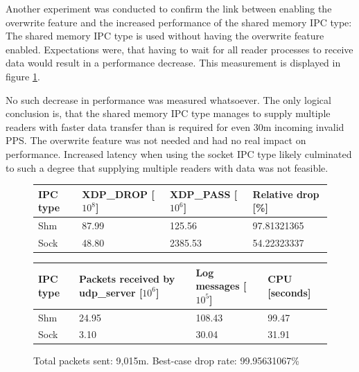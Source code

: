 Another experiment was conducted to confirm the link between enabling the overwrite feature and the increased performance of the shared memory \ac{IPC} type:
The shared memory \ac{IPC} type is used without having the overwrite feature enabled.
Expectations were, that having to wait for all reader processes to receive data would result in a performance decrease.
This measurement is displayed in figure \ref{fig:data:ipv4v6:30m:131068:2nd:NoOverwrite}.

No such decrease in performance was measured whatsoever.
The only logical conclusion is, that the shared memory \ac{IPC} type manages to supply multiple readers with faster data transfer than is required for even 30m incoming invalid \ac{PPS}.
The overwrite feature was not needed and had no real impact on performance.
Increased latency when using the socket \ac{IPC} type likely culminated to such a degree that supplying multiple readers with data was not feasible.

\begin{figure}[!h]
	\centering
	\scriptsize
	\begin{tabular}{llll}
		\toprule
		\textbf{IPC type} & \textbf{XDP\_DROP [$10^8$]} & \textbf{XDP\_PASS [$10^6$]} & \textbf{Relative drop [\%]} \\ \midrule 
		Shm & 87.99 & 125.56 & 97.81321365 \\
        Sock & 48.80 & 2385.53 & 54.22323337 \\
	\bottomrule
	\end{tabular}
    \begin{tabular}{llll}
		\toprule
		\textbf{IPC type} & \textbf{Packets received by udp\_server [$10^6$]} & \textbf{Log messages [$10^5$]} & \textbf{CPU [seconds]} \\ \midrule 
		Shm & 24.95 & 108.43 & 99.47 \\
        Sock & 3.10 & 30.04 & 31.91 \\
	\bottomrule
	\end{tabular}
	\caption[Simplefail2ban with 2nd Reader, IPv4v6, 30m \ac{PPS}, 131,068 malicious clients]{Total packets sent: 9,015m. Best-case drop rate: 99.95631067\%}
	\label{fig:data:ipv4v6:30m:131068:2nd:NoOverwrite}
\end{figure}
